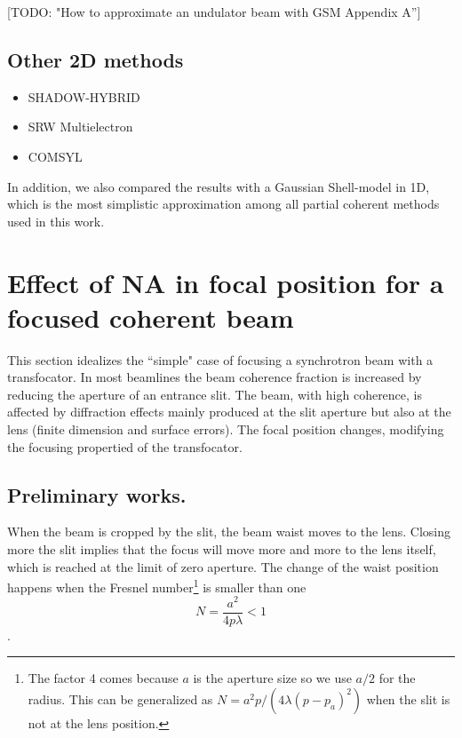 \documentclass{iucr}              %
\newcommand{\todo}[1]{{\color{red}[TODO: "#1'']}}
\begin{document}
\todo{How to approximate an undulator beam with GSM  Appendix A}


\subsection{Other 2D methods}
\begin{itemize}
    \item {SHADOW-HYBRID}
    \item SRW Multielectron
    \item COMSYL
\end{itemize}

In addition, we also compared the results with a Gaussian Shell-model in 1D, which is the most simplistic approximation among all partial coherent methods used in this work. 

\section{Effect of NA in focal position for a focused coherent beam}

This section idealizes the ``simple" case of focusing a synchrotron beam with a transfocator. In most beamlines the beam coherence fraction is increased by reducing the aperture of an entrance slit. The beam, with high coherence, is affected by diffraction effects mainly produced at the slit aperture but also at the lens (finite dimension and surface errors). The focal position changes, modifying the focusing propertied of the transfocator. 

\subsection{Preliminary works.}

When the beam is cropped by the slit, the beam waist moves to the lens. Closing more the slit implies that the focus will move more and more to the lens itself, which is reached at the limit of zero aperture. The change of the waist position happens when the Fresnel number\footnote{The factor 4 comes because $a$ is the aperture size so we use $a/2$ for the radius. This can be generalized as $N=a^2 p / (4 \lambda (p-p_a)^2)$ when the slit is not at the lens position.} is smaller than one
\begin{equation}
    N = \frac{a^2}{4 p \lambda}  < 1
\end{equation}. 
\end{document}
